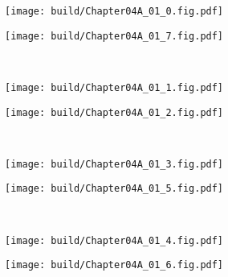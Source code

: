 \begin{Figure}[差分放大器的差模特性]
    \begin{FigureSub}
        \texttt{[image: build/Chapter04A\_01\_0.fig.pdf]}
    \end{FigureSub} \hspace{0.3cm}
    \begin{FigureSub}
        \texttt{[image: build/Chapter04A\_01\_7.fig.pdf]}
    \end{FigureSub}\\ \vspace{0.5cm}
    \begin{FigureSub}
        \texttt{[image: build/Chapter04A\_01\_1.fig.pdf]}
    \end{FigureSub} \hspace{0.16cm}
    \begin{FigureSub}
        \texttt{[image: build/Chapter04A\_01\_2.fig.pdf]}
    \end{FigureSub} \hspace*{0.14cm}\\ \vspace{0.5cm}
    \begin{FigureSub}
        \texttt{[image: build/Chapter04A\_01\_3.fig.pdf]}
    \end{FigureSub} \hspace{0.1cm}
    \begin{FigureSub}
        \texttt{[image: build/Chapter04A\_01\_5.fig.pdf]}
    \end{FigureSub}\\ \vspace{0.5cm}
    \hspace*{-0.3cm}
    \begin{FigureSub}
        \texttt{[image: build/Chapter04A\_01\_4.fig.pdf]}
    \end{FigureSub} \hspace{0.13cm}
    \begin{FigureSub}
        \texttt{[image: build/Chapter04A\_01\_6.fig.pdf]}
    \end{FigureSub}
\end{Figure}

